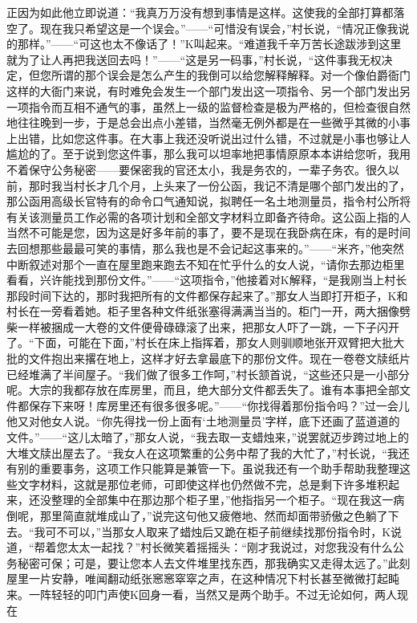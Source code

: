 \documentclass[12pt,a4paper]{article}
\begin{document}
正因为如此他立即说道：“我真万万没有想到事情是这样。这使我的全部打算都落空了。现在我只希望这是一个误会。”——“可惜没有误会，”村长说，“情况正像我说的那样。”——“可这也太不像话了！”K叫起来。“难道我千辛万苦长途跋涉到这里就为了让人再把我送回去吗！”——“这是另一码事，”村长说，“这件事我无权决定，但您所谓的那个误会是怎么产生的我倒可以给您解释解释。对一个像伯爵衙门这样的大衙门来说，有时难免会发生一个部门发出这一项指令、另一个部门发出另一项指令而互相不通气的事，虽然上一级的监督检查是极为严格的，但检查很自然地往往晚到一步，于是总会出点小差错，当然毫无例外都是在一些微乎其微的小事上出错，比如您这件事。在大事上我还没听说出过什么错，不过就是小事也够让人尴尬的了。至于说到您这件事，那么我可以坦率地把事情原原本本讲给您听，我用不着保守公务秘密——要保密我的官还太小，我是务农的，一辈子务农。很久以前，那时我当村长才几个月，上头来了一份公函，我记不清是哪个部门发出的了，那公函用高级长官特有的命令口气通知说，拟聘任一名土地测量员，指令村公所将有关该测量员工作必需的各项计划和全部文字材料立即备齐待命。这公函上指的人当然不可能是您，因为这是好多年前的事了，要不是现在我卧病在床，有的是时间去回想那些最最可笑的事情，那么我也是不会记起这事来的。”——“米齐，”他突然中断叙述对那个一直在屋里跑来跑去不知在忙乎什么的女人说，“请你去那边柜里看看，兴许能找到那份文件。”——“这项指令，”他接着对K解释，“是我刚当上村长那段时间下达的，那时我把所有的文件都保存起来了。”那女人当即打开柜子，K和村长在一旁看着她。柜子里各种文件纸张塞得满满当当的。柜门一开，两大捆像劈柴一样被捆成一大卷的文件便骨碌碌滚了出来，把那女人吓了一跳，一下子闪开了。“下面，可能在下面，”村长在床上指挥着，那女人则驯顺地张开双臂把大批大批的文件抱出来撂在地上，这样才好去拿最底下的那份文件。现在一卷卷文牍纸片已经堆满了半间屋子。“我们做了很多工作呵，”村长颔首说，“这些还只是一小部分呢。大宗的我都存放在库房里，而且，绝大部分文件都丢失了。谁有本事把全部文件都保存下来呀！库房里还有很多很多呢。”——“你找得着那份指令吗？”过一会儿他又对他女人说。“你先得找一份上面有‘土地测量员’字样，底下还画了蓝道道的文件。”——“这儿太暗了，”那女人说，“我去取一支蜡烛来，”说罢就迈步跨过地上的大堆文牍出屋去了。“我女人在这项繁重的公务中帮了我的大忙了，”村长说，“我还有别的重要事务，这项工作只能算是兼管一下。虽说我还有一个助手帮助我整理这些文字材料，这就是那位老师，可即使这样也仍然做不完，总是剩下许多堆积起来，还没整理的全部集中在那边那个柜子里，”他指指另一个柜子。“现在我这一病倒呢，那里简直就堆成山了，”说完这句他又疲倦地、然而却面带骄傲之色躺了下去。“我可不可以，”当那女人取来了蜡烛后又跪在柜子前继续找那份指令时，K说道，“帮着您太太一起找？”村长微笑着摇摇头：“刚才我说过，对您我没有什么公务秘密可保；可是，要让您本人去文件堆里找东西，那我确实又走得太远了。”此刻屋里一片安静，唯闻翻动纸张窸窸窣窣之声，在这种情况下村长甚至微微打起盹来。一阵轻轻的叩门声使K回身一看，当然又是两个助手。不过无论如何，两人现在
\end{document}
